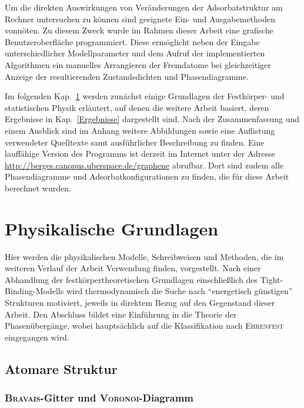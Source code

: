 \documentclass[a4paper, 10pt, twoside, openany]{book} %
\begin{document}
Um die direkten Auswirkungen von Veränderungen der Adsorbatstruktur am Rechner untersuchen zu können sind geeignete Ein- und Ausgabemethoden vonnöten. Zu diesem Zweck wurde im Rahmen dieser Arbeit eine grafische Benutzeroberfläche programmiert. Diese ermöglicht neben der Eingabe unterschiedlicher Modellparameter und dem Aufruf der implementierten Algorithmen ein manuelles Arrangieren der Fremdatome bei gleichzeitiger Anzeige der resultierenden Zustandsdichten und Phasendiagramme.

Im folgenden Kap.~\ref{Theorie} werden zunächst einige Grundlagen der Festkörper- und statistischen Physik erläutert, auf denen die weitere Arbeit basiert, deren Ergebnisse in Kap.~\ref{Ergebnisse} dargestellt sind. Nach der Zusammenfassung und einem Ausblick sind im Anhang weitere Abbildungen sowie eine Auflistung verwendeter Quelltexte samt ausführlicher Beschreibung zu finden. Eine lauffähige Version des Programms ist derzeit im Internet unter der Adresse \url{http://berges.canopus.uberspace.de/graphene} abrufbar. Dort sind zudem alle Phasendiagramme und Adsorbatkonfigurationen zu finden, die für diese Arbeit berechnet wurden.

\chapter{Physikalische Grundlagen}
\label{Theorie}

Hier werden die physikalischen Modelle, Schreibweisen und Methoden, die im weiteren Verlauf der Arbeit Verwendung finden, vorgestellt. Nach einer Abhandlung der festkörpertheoretischen Grundlagen einschließlich des Tight-Binding-Modells wird thermodynamisch die Suche nach "`energetisch günstigen"' Strukturen motiviert, jeweils in direktem Bezug auf den Gegenstand dieser Arbeit. Den Abschluss bildet eine Einführung in die Theorie der Phasenübergänge, wobei hauptsächlich auf die Klassifikation nach \textsc{Ehrenfest} eingegangen wird.

\section{Atomare Struktur}
\label{Atomare Struktur}

\subsection{\textsc{Bravais}-Gitter und \textsc{Voronoi}-Diagramm}
\label{Bravais-Gitter}
\end{document}

